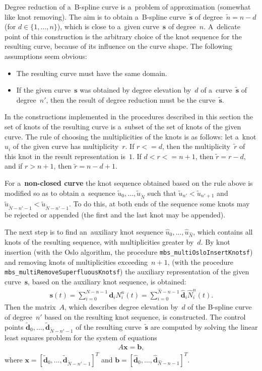Degree reduction of a~B-spline curve is a~problem of approximation
(somewhat like knot removing). The aim is to obtain a~B-spline
curve~$\tilde{\bm{s}}$ of degree~$\tilde{n}=n-d$ (for
$d\in\{1,\ldots,n\}$), which is close to a~given curve~$\bm{s}$ of degree~$n$.
A~delicate point of this construction is the arbitrary choice of
the knot sequence for the resulting curve, because of its influence on the
curve shape. The following assumptions seem obvious:
\begin{itemize}
  \item The resulting curve must have the same domain.
  \item If the given curve~$\bm{s}$ was obtained by degree elevation by~$d$
    of a~curve~$\tilde{\bm{s}}$ of degree~$n'$, then the result
    of degree reduction must be the curve~$\tilde{\bm{s}}$.
\end{itemize}
In the constructions implemented in the procedures described in this section
the set of knots of the resulting curve is a~subset of the set of knots
of the given curve. The rule of choosing the multiplicities of the knots
is as follows: let a~knot $u_i$ of the given curve has multiplicity~$r$.
\pagebreak[2]
If $r<=d$, then the multiplicity~$\tilde{r}$ of this knot in the result
representation is~$1$. If $d<r<=n+1$, then $\tilde{r}=r-d$,
and if $r>n+1$, then $\tilde{r}=n-d+1$.

For a~\textbf{non-closed curve} the knot sequence obtained based on the rule
above is modified so as to obtain a~sequence
$\tilde{u}_0,\ldots,\tilde{u}_{\tilde{N}}$ such that
$\tilde{u}_{n'}<\tilde{u}_{n'+1}$ and
$\tilde{u}_{\tilde{N}-n'-1}<\tilde{u}_{\tilde{N}-n'-1}$. To do this,
at both ends of the sequence some knots may be rejected or appended
(the first and the last knot may be appended).

\begin{sloppypar}
The next step is to find an~auxiliary knot sequence
$\hat{u}_0,\ldots,\hat{u}_{\hat{N}}$, which contains all knots of the resulting
sequence, with multiplicities greater by~$d$. By knot insertion
(with the Oslo algorithm, the procedure \texttt{mbs\_multiOsloInsertKnotsf})
and removing knots of multiplicities exceeding~$n+1$,
(with the procedure \texttt{mbs\_multiRemoveSuperfluousKnotsf}) the
auxiliary representation of the given curve~$\bm{s}$, based on the auxiliary
knot sequence, is obtained:
\begin{align*}
  \bm{s}(t) = \sum_{i=0}^{N-n-1}\bm{d}_iN^n_i(t) =
  \sum_{i=0}^{\hat{N}-n-1}\hat{\bm{d}}_i\hat{N}^n_i(t).
\end{align*}
Then the matrix~$A$, which describes degree elevation by~$d$
of the B-spline curve of degree~$n'$ based on the resulting knot sequence,
is constructed. The control points
$\tilde{\bm{d}}_0,\ldots,\tilde{\bm{d}}_{\tilde{N}-n'-1}$ of the
resulting curve~$\tilde{\bm{s}}$ are computed by solving the linear least
squares problem for the system of equations
\begin{align*}
  A\bm{x}=\bm{b},
\end{align*}
where $\bm{x}=[\tilde{\bm{d}}_0,\ldots,\tilde{\bm{d}}_{\tilde{N}-n'-1}]^T$
and $\bm{b}=[\hat{\bm{d}}_0,\ldots,\hat{\bm{d}}_{\hat{N}-n-1}]^T$.%
\end{sloppypar}



